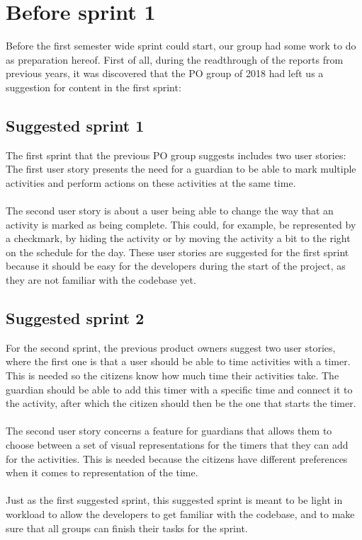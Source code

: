 \section{Before sprint 1}
Before the first semester wide sprint could start, our group had some work to do as preparation hereof.
First of all, during the readthrough of the reports from previous years, it was discovered that the PO group of 2018 had left us a suggestion for content in the first sprint:

\subsection*{Suggested sprint 1}
The first sprint that the previous PO group suggests includes two user stories:
The first user story presents the need for a guardian to be able to mark multiple activities and perform actions on these activities at the same time.
\\\\
The second user story is about a user being able to change the way that an activity is marked as being complete.
This could, for example, be represented by a checkmark, by hiding the activity or by moving the activity a bit to the right on the schedule for the day.
These user stories are suggested for the first sprint because it should be easy for the developers during the start of the project, as they are not familiar with the codebase yet.

\subsection*{Suggested sprint 2}
For the second sprint, the previous product owners suggest two user stories, where the first one is that a user should be able to time activities with a timer.
This is needed so the citizens know how much time their activities take.
The guardian should be able to add this timer with a specific time and connect it to the activity, after which the citizen should then be the one that starts the timer.
\\\\
The second user story concerns a feature for guardians that allows them to choose between a set of visual representations for the timers that they can add for the activities.
This is needed because the citizens have different preferences when it comes to representation of the time.
\\\\
Just as the first suggested sprint, this suggested sprint is meant to be light in workload to allow the developers to get familiar with the codebase, and to make sure that all groups can finish their tasks for the sprint.


